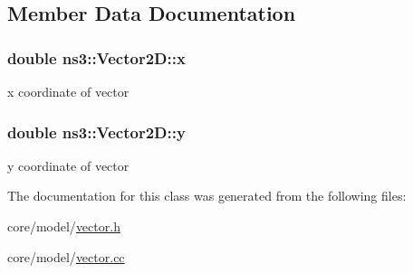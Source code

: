 \subsection{Member Data Documentation}
\subsubsection[{\texorpdfstring{x}{x}}]{\setlength{\rightskip}{0pt plus 5cm}double ns3\+::\+Vector2\+D\+::x}\hypertarget{classns3_1_1Vector2D_a82ba41e508970719c0907b031eefa572}{}\label{classns3_1_1Vector2D_a82ba41e508970719c0907b031eefa572}
x coordinate of vector 
\subsubsection[{\texorpdfstring{y}{y}}]{\setlength{\rightskip}{0pt plus 5cm}double ns3\+::\+Vector2\+D\+::y}\hypertarget{classns3_1_1Vector2D_a4ba4640626850d67ed91d76da816ee09}{}\label{classns3_1_1Vector2D_a4ba4640626850d67ed91d76da816ee09}
y coordinate of vector 

The documentation for this class was generated from the following files\+:\begin{DoxyCompactItemize}
\item 
core/model/\hyperlink{vector_8h}{vector.\+h}\item 
core/model/\hyperlink{vector_8cc}{vector.\+cc}\end{DoxyCompactItemize}

